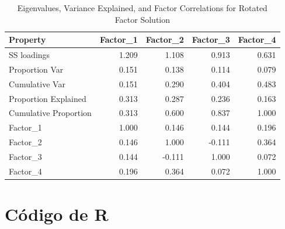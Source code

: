 \documentclass[
  12pt,
]{article}
\newenvironment{Shaded}{\begin{snugshade}}{\end{snugshade}}
\newcommand{\NormalTok}[1]{\textcolor[rgb]{0.00,0.23,0.31}{#1}}
\newcommand{\SpecialCharTok}[1]{\textcolor[rgb]{0.37,0.37,0.37}{#1}}
\begin{document}
\begin{Shaded}
\end{Shaded}

\begin{table}
\caption*{
{\large Eigenvalues, Variance Explained, and Factor Correlations for Rotated Factor Solution}
} 
\fontsize{12.0pt}{14.4pt}\selectfont
\begin{tabular*}{\linewidth}{@{\extracolsep{\fill}}lrrrr}
\toprule
Property & Factor\_1 & Factor\_2 & Factor\_3 & Factor\_4 \\ 
\midrule\addlinespace[2.5pt]
SS loadings & 1.209 & 1.108 & 0.913 & 0.631 \\ 
Proportion Var & 0.151 & 0.138 & 0.114 & 0.079 \\ 
Cumulative Var & 0.151 & 0.290 & 0.404 & 0.483 \\ 
Proportion Explained & 0.313 & 0.287 & 0.236 & 0.163 \\ 
Cumulative Proportion & 0.313 & 0.600 & 0.837 & 1.000 \\ 
Factor\_1 & 1.000 & 0.146 & 0.144 & 0.196 \\ 
Factor\_2 & 0.146 & 1.000 & -0.111 & 0.364 \\ 
Factor\_3 & 0.144 & -0.111 & 1.000 & 0.072 \\ 
Factor\_4 & 0.196 & 0.364 & 0.072 & 1.000 \\ 
\bottomrule
\end{tabular*}
\end{table}

\section{Código de R}\label{cuxf3digo-de-r}
\end{document}

